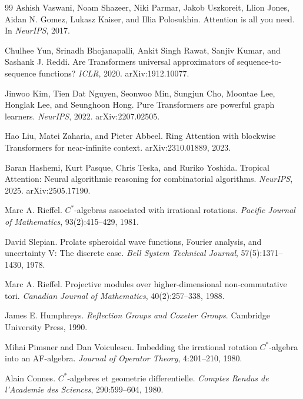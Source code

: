 \documentclass[11pt]{article}
\theoremstyle{definition}
\theoremstyle{plain}
\theoremstyle{remark}
\numberwithin{equation}{section}
\begin{document}
\begin{thebibliography}{99}
Ashish Vaswani, Noam Shazeer, Niki Parmar, Jakob Uszkoreit, Llion Jones, Aidan N. Gomez, Lukasz Kaiser, and Illia Polosukhin.
\newblock Attention is all you need.
\newblock In \emph{NeurIPS}, 2017.

Chulhee Yun, Srinadh Bhojanapalli, Ankit Singh Rawat, Sanjiv Kumar, and Sashank J. Reddi.
\newblock Are Transformers universal approximators of sequence-to-sequence functions?
\newblock \emph{ICLR}, 2020. arXiv:1912.10077.

Jinwoo Kim, Tien Dat Nguyen, Seonwoo Min, Sungjun Cho, Moontae Lee, Honglak Lee, and Seunghoon Hong.
\newblock Pure Transformers are powerful graph learners.
\newblock \emph{NeurIPS}, 2022. arXiv:2207.02505.

Hao Liu, Matei Zaharia, and Pieter Abbeel.
\newblock Ring Attention with blockwise Transformers for near-infinite context.
\newblock arXiv:2310.01889, 2023.

Baran Hashemi, Kurt Pasque, Chris Teska, and Ruriko Yoshida.
\newblock Tropical Attention: Neural algorithmic reasoning for combinatorial algorithms.
\newblock \emph{NeurIPS}, 2025. arXiv:2505.17190.

Marc A. Rieffel.
\newblock $C^*$-algebras associated with irrational rotations.
\newblock \emph{Pacific Journal of Mathematics}, 93(2):415--429, 1981.

David Slepian.
\newblock Prolate spheroidal wave functions, Fourier analysis, and uncertainty V: The discrete case.
\newblock \emph{Bell System Technical Journal}, 57(5):1371--1430, 1978.

Marc A. Rieffel.
\newblock Projective modules over higher-dimensional non-commutative tori.
\newblock \emph{Canadian Journal of Mathematics}, 40(2):257--338, 1988.

James E. Humphreys.
\newblock \emph{Reflection Groups and Coxeter Groups}.
\newblock Cambridge University Press, 1990.

Mihai Pimsner and Dan Voiculescu.
\newblock Imbedding the irrational rotation $C^*$-algebra into an AF-algebra.
\newblock \emph{Journal of Operator Theory}, 4:201--210, 1980.

Alain Connes.
\newblock $C^*$-algebres et geometrie differentielle.
\newblock \emph{Comptes Rendus de l'Academie des Sciences}, 290:599--604, 1980.


\end{thebibliography}
\end{document}
